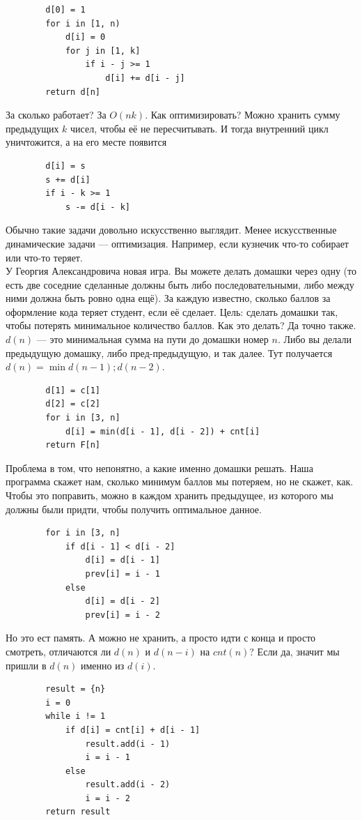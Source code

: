 \documentclass{article}
\newcommand{\pseudo}{PseudoLexer.py:PseudoLexer -x}
\begin{document}
    \begin{verbatim}
        d[0] = 1
        for i in [1, n)
            d[i] = 0
            for j in [1, k]
                if i - j >= 1
                    d[i] += d[i - j]
        return d[n]
    \end{verbatim}
    За сколько работает? За $O(nk)$. Как оптимизировать? Можно хранить сумму предыдущих $k$ чисел, чтобы её не пересчитывать. И тогда внутренний цикл уничтожится, а на его месте появится
    \begin{verbatim}
        d[i] = s
        s += d[i]
        if i - k >= 1
            s -= d[i - k]
    \end{verbatim}
    Обычно такие задачи довольно искусственно выглядит. Менее искусственные динамические задачи --- оптимизация. Например, если кузнечик что-то собирает или что-то теряет.\\
    У Георгия Александровича новая игра. Вы можете делать домашки через одну (то есть две соседние сделанные должны быть либо последовательными, либо между ними должна быть ровно одна ещё). За каждую известно, сколько баллов за оформление кода теряет студент, если её сделает. Цель: сделать домашки так, чтобы потерять минимальное количество баллов. Как это делать? Да точно также. $d(n)$ --- это минимальная сумма на пути до домашки номер $n$. Либо вы делали предыдущую домашку, либо пред-предыдущую, и так далее. Тут получается $d(n)=\min{d(n-1);d(n-2)}$.
    \begin{verbatim}
        d[1] = c[1]
        d[2] = c[2]
        for i in [3, n]
            d[i] = min(d[i - 1], d[i - 2]) + cnt[i]
        return F[n]
    \end{verbatim}
    Проблема в том, что непонятно, а какие именно домашки решать. Наша программа скажет нам, сколько минимум баллов мы потеряем, но не скажет, как. Чтобы это поправить, можно в каждом хранить предыдущее, из которого мы должны были придти, чтобы получить оптимальное данное.
    \begin{verbatim}
        for i in [3, n]
            if d[i - 1] < d[i - 2]
                d[i] = d[i - 1]
                prev[i] = i - 1
            else
                d[i] = d[i - 2]
                prev[i] = i - 2
    \end{verbatim}
    Но это ест память. А можно не хранить, а просто идти с конца и просто смотреть, отличаются ли $d(n)$ и $d(n-i)$ на $cnt(n)$? Если да, значит мы пришли в $d(n)$ именно из $d(i)$.
    \begin{verbatim}
        result = {n}
        i = 0
        while i != 1
            if d[i] = cnt[i] + d[i - 1]
                result.add(i - 1)
                i = i - 1
            else
                result.add(i - 2)
                i = i - 2
        return result
    \end{verbatim}
\end{document}
